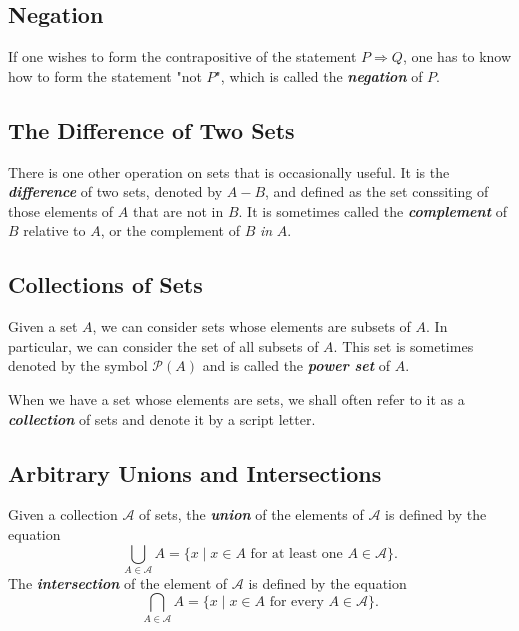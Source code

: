 \documentclass[a4paper,12pt,twoside,openany]{book}
\begin{document}
\subsection{Negation}

If one wishes to form the contrapositive of the statement $P\Rightarrow Q$, one has to know how to form the statement "not $P$", which is called the \textit{\textbf{negation}} of $P$.

\subsection{The Difference of Two Sets}

There is one other operation on sets that is occasionally useful. It is the \textit{\textbf{difference}} of two sets, denoted by $A-B$, and defined as the set conssiting of those elements of $A$ that are not in $B$. It is sometimes called the \textit{\textbf{complement}} of $B$ relative to $A$, or the complement of $B$ \textit{in} $A$.

\subsection{Collections of Sets}

Given a set $A$, we can consider sets whose elements are subsets of $A$. In particular, we can consider the set of all subsets of $A$. This set is sometimes denoted by the symbol $\mathcal{P}(A)$ and is called the \textit{\textbf{power set}} of $A$.

When we have a set whose elements are sets, we shall often refer to it as a \textit{\textbf{collection}} of sets and denote it by a script letter.

\subsection{Arbitrary Unions and Intersections}

Given a collection $\mathscr{A}$ of sets, the \textit{\textbf{union}} of the elements of $\mathscr{A}$ is defined by the equation $$\bigcup_{A\in \mathscr{A}}A=\{x\mid x\in A\text{ for at least one }A\in\mathscr{A}\}.$$ The \textit{\textbf{intersection}} of the element of $\mathscr{A}$ is defined by the equation $$\bigcap_{A\in\mathscr{A}}A=\{x\mid x\in A\text{ for every }A\in\mathscr{A}\}.$$

\end{document}
